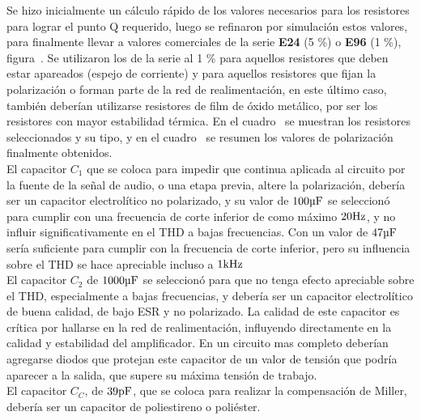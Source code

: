 
Se hizo inicialmente un cálculo rápido de los valores necesarios para los resistores para lograr el punto Q requerido, luego se refinaron por simulación estos valores, para finalmente llevar a valores comerciales de la serie \textbf{E24} (5 \%) o \textbf{E96} (1 \%), figura~. Se utilizaron los de la serie al 1 \% para aquellos resistores que deben estar apareados (espejo de corriente) y para aquellos resistores que fijan la polarización o forman parte de la red de realimentación, en este último caso, también deberían utilizarse resistores de film de óxido metálico, por ser los resistores con mayor estabilidad térmica. En el cuadro~ se muestran los resistores seleccionados y su tipo, y en el cuadro~ se resumen los valores de polarización finalmente obtenidos. \\

El capacitor $C_{1}$ que se coloca para impedir que continua aplicada al circuito por la fuente de la señal de audio, o una etapa previa, altere la polarización, debería ser un capacitor electrolítico no polarizado, y su valor de $100 \si[per-mode=symbol]{\micro\farad}$ se seleccionó para cumplir con una frecuencia de corte inferior de como máximo $20 \si[per-mode=symbol]{\hertz}$, y no influir significativamente en el THD a bajas frecuencias. Con un valor de $47 \si[per-mode=symbol]{\micro\farad}$ sería suficiente para cumplir con la frecuencia de corte inferior, pero su influencia sobre el THD se hace apreciable incluso a $1 \si[per-mode=symbol]{\kilo\hertz}$ \\

El capacitor $C_{2}$ de $1000 \si[per-mode=symbol]{\micro\farad}$ se seleccionó para que no tenga efecto apreciable sobre el THD, especialmente a bajas frecuencias, y debería ser un capacitor electrolítico de buena calidad, de bajo ESR y no polarizado. La calidad de este capacitor es crítica por hallarse en la red de realimentación, influyendo directamente en la calidad y estabilidad del amplificador. En un circuito mas completo deberían agregarse diodos que protejan este capacitor de un valor de tensión que podría aparecer a la salida, que supere su máxima tensión de trabajo. \\

El capacitor $C_{C}$, de $39 \si[per-mode=symbol]{\pico\farad}$, que se coloca para realizar la compensación de Miller, debería ser un capacitor de poliestireno o poliéster.


\clearpage

